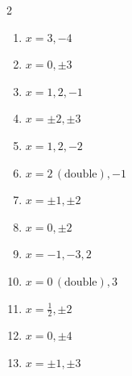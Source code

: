 \documentclass[11pt]{article}
\begin{document}
\begin{keybox}
\begin{multicols}{2}
\small
\begin{enumerate}[leftmargin=*,itemsep=3pt]
  \item $x=3,-4$
  \item $x=0,\pm3$
  \item $x=1,2,-1$
  \item $x=\pm2,\pm3$
  \item $x=1,2,-2$
  \item $x=2\,(\text{double}),-1$
  \item $x=\pm1,\pm2$
  \item $x=0,\pm2$
  \item $x=-1,-3,2$
  \item $x=0\,(\text{double}),3$
  \item $x=\tfrac12,\pm2$
  \item $x=0,\pm4$
  \item $x=\pm1,\pm3$
\end{enumerate}
\end{multicols}
\end{keybox}
\end{document}
